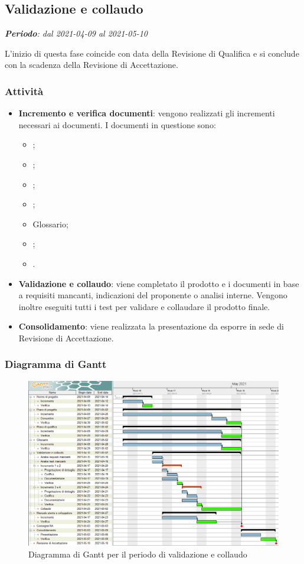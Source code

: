 \subsection{Validazione e collaudo}
\textit{\textbf{Periodo}: dal 2021-04-09 al 2021-05-10}

L'inizio di questa fase coincide con data della Revisione di Qualifica e si conclude con la scadenza della Revisione di Accettazione.

\subsubsection{Attività}

\begin{itemize}
\item \textbf{Incremento e verifica documenti}: vengono realizzati gli incrementi necessari ai documenti. I documenti in questione sono:
\begin{itemize}
\item \NdP{};
\item \AdR{};
\item \PdQ{};
\item \PdP{};
\item Glossario;
\item \MU{};
\item \MM{}.
\end{itemize}
\item \textbf{Validazione e collaudo}: viene completato il prodotto e i documenti in base a requisiti mancanti, indicazioni del proponente o analisi interne. Vengono inoltre eseguiti tutti i test per validare e collaudare il prodotto finale.
\item \textbf{Consolidamento}: viene realizzata la presentazione da esporre in sede di Revisione di Accettazione.
\end{itemize}





\subsubsection{Diagramma di Gantt}

\begin{figure}[H]
\centering

\centerline{\includegraphics[scale=0.6]{res/Pianificazione/Gantt/verifica}}
\caption{Diagramma di Gantt per il periodo di validazione e collaudo}
\end{figure}